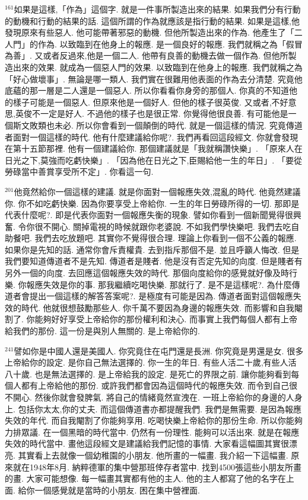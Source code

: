 \documentclass{book}
\begin{document}
$^{161}$如果是這樣,「作為」這個字.
就是一件事所製造出來的結果.
如果我們分有行動的動機和行動的結果的話.
這個所謂的作為就應該是指行動的結果.
如果是這樣,他發現原來有些惡人.
他可能帶著邪惡的動機.
但他所製造出來的作為.
他產生了「二人門」的作為.
以致臨到在他身上的報應.
是一個良好的報應.
我們就稱之為「假冒為善」.
又或者反過來,他是一個二人.
他帶有良善的動機去做一個作為.
但他所製造出來的效果.
就成為一個惡人門的效果.
以致臨到在他身上的報應.
我們就稱之為「好心做壞事」.
無論是哪一類人.
我們實在很難用他表面的作為去分清楚.
究竟他底蘊的那一層是二人還是一個惡人.
所以你看看你身旁的那個人.
你真的不知道他的樣子可能是一個惡人.
但原來他是一個好人.
但他的樣子很英俊.
又或者,不好意思,英俊不一定是好人.
不過他的樣子也是很正常.
你覺得他很良善.
有可能他是一個斯文敗類也未必.
所以你會看到一個顛倒的時代.
就是一個這樣的情況.
究竟傳道者面對一個這樣的時代.
他有什麼建議給你呢?.
我們再看回這段經文.
你就會發現在第十五節那裡.
他有一個建議給你.
那個建議就是「我就稱讚快樂」.
「原來人在日光之下,莫強而吃虧快樂」.
「因為他在日光之下,臣賜給他一生的年日」.
「要從勞碌當中善賞享受所不定」.
你看這一句.

$^{201}$他竟然給你一個這樣的建議.
就是你面對一個報應失效,混亂的時代.
他竟然建議你.
你不如吃虧快樂.
因為你要享受上帝給你.
一生的年日勞碌所得的一切.
那即是代表什麼呢?.
即是代表你面對一個報應失衡的現象.
譬如你看到一個新聞覺得很興奮.
令你很不開心.
關掉電視的時候就跟你老婆說.
不如我們學快樂吧.
我們去吃自助餐吧.
我們去吃放題吧.
其實你不覺得很合理.
理論上你看到一個不公義的報應.
如果你是先知的話.
通常你會斥責權貴.
去到指斥那個不是.
並且呼籲人悔改.
但是我們要知道傳道者不是先知.
傳道者是賤者.
他是沒有否定先知的向度.
但是賤者有另外一個的向度.
去回應這個報應失效的時代.
那個向度給你的感覺就好像及時行樂.
你報應失效是你的事.
那我繼續吃喝快樂.
那就行了.
是不是這樣呢?.
為什麼傳道者會提出一個這樣的解答答案呢?.
是極度有可能是因為.
傳道者面對這個報應失效的時代.
他就很想鼓勵那些人.
你千萬不要因為身邊的報應失效.
而影響和自我閹割了.
你能夠好好享受上帝給你的那份權利和決心.
而事實上我們每個人都有上帝給我們的那份.
這一份是與別人無關的.
是上帝給你的.

$^{241}$譬如你是中國人還是美國人.
你究竟住在屯門還是長洲.
你究竟是男還是女.
很多上帝給你的設定.
是你自己無法選擇的.
你一生的年日.
有些人活二十歲,有些人活八十歲.
也是無法選擇的.
是上帝給我的設定.
是死亡的界限之前.
讓你能夠看到每個人都有上帝給他的那份.
或許我們都會因為這個時代的報應失效.
而令到自己很不開心.
然後你就會發脾氣.
將自己的情緒竟然宣洩在.
一班上帝給你的身邊的人身上.
包括你太太,你的丈夫.
而這個傳道書亦都提醒我們.
我們是無需要.
是因為報應失效的年代.
而自我閹割了你能夠享用.
吃喝快樂上帝給你的那份生命.
所以你能夠力排眾議.
在一個黑暗的時代當中.
仍然有一份理性.
能夠可以活出來.
就是在報應失效的時代當中.
畫他這段經文是建議給我們記憶的事情.
大家看這幅圖其實很漂亮.
其實看上去就像一個幼稚園的小朋友.
他所畫的一幅畫.
我介紹一下這幅畫.
原來就在1948年8月.
納粹德軍的集中營那班倖存者當中.
找到4500張這些小朋友所畫的畫.
大家可能想像.
每一幅畫其實都有他的主人.
他的主人都寫了他的名字在上面.
給你一個感覺就是當時的小朋友.
困在集中營裡面.
\end{document}
